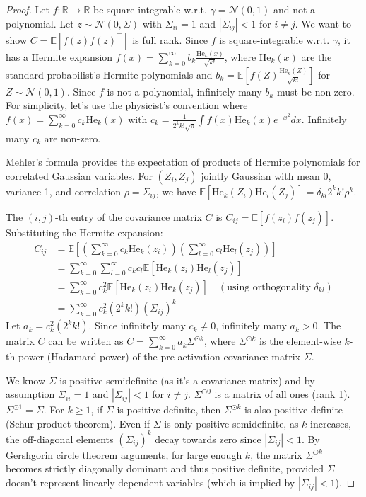\documentclass{article}
\newcommand{\R}{\mathbb{R}}
\newcommand{\E}{\mathbb{E}}
\newcommand{\He}{\mathrm{He}}
\begin{document}
\begin{proof}
    Let $f:\R\to\R$ be square-integrable w.r.t. $\gamma = \mathcal{N}(0,1)$ and not a polynomial. Let $z \sim \mathcal{N}(0, \Sigma)$ with $\Sigma_{ii}=1$ and $|\Sigma_{ij}| < 1$ for $i \neq j$. We want to show $C = \E[f(z)f(z)^\top]$ is full rank.
    Since $f$ is square-integrable w.r.t. $\gamma$, it has a Hermite expansion $f(x) = \sum_{k=0}^{\infty} b_k \frac{\He_k(x)}{\sqrt{k!}}$, where $\He_k(x)$ are the standard probabilist's Hermite polynomials and $b_k = \E[f(Z) \frac{\He_k(Z)}{\sqrt{k!}}]$ for $Z \sim \mathcal{N}(0,1)$. Since $f$ is not a polynomial, infinitely many $b_k$ must be non-zero. For simplicity, let's use the physicist's convention where $f(x) = \sum_{k=0}^{\infty} c_k \He_k(x)$ with $c_k = \frac{1}{2^k k! \sqrt{\pi}} \int f(x) \He_k(x) e^{-x^2} dx$. Infinitely many $c_k$ are non-zero.

    Mehler's formula \cite{mehler1866ueber, erdelyi1953higher} provides the expectation of products of Hermite polynomials for correlated Gaussian variables. For $(Z_i, Z_j)$ jointly Gaussian with mean 0, variance 1, and correlation $\rho = \Sigma_{ij}$, we have $\E[\He_k(Z_i) \He_l(Z_j)] = \delta_{kl} 2^k k! \rho^k$.

    The $(i, j)$-th entry of the covariance matrix $C$ is $C_{ij} = \E[f(z_i) f(z_j)]$. Substituting the Hermite expansion:
    \begin{align*}
    C_{ij} &= \E\left[ \left( \sum_{k=0}^{\infty} c_k \He_k(z_i) \right) \left( \sum_{l=0}^{\infty} c_l \He_l(z_j) \right) \right] \\
    &= \sum_{k=0}^{\infty} \sum_{l=0}^{\infty} c_k c_l \E[\He_k(z_i) \He_l(z_j)] \\
    &= \sum_{k=0}^{\infty} c_k^2 \E[\He_k(z_i) \He_k(z_j)] \quad (\text{using orthogonality } \delta_{kl}) \\
    &= \sum_{k=0}^{\infty} c_k^2 (2^k k!) (\Sigma_{ij})^k
    \end{align*}
    Let $a_k = c_k^2 (2^k k!)$. Since infinitely many $c_k \neq 0$, infinitely many $a_k > 0$. The matrix $C$ can be written as $C = \sum_{k=0}^{\infty} a_k \Sigma^{\odot k}$, where $\Sigma^{\odot k}$ is the element-wise $k$-th power (Hadamard power) of the pre-activation covariance matrix $\Sigma$.

    We know $\Sigma$ is positive semidefinite (as it's a covariance matrix) and by assumption $\Sigma_{ii}=1$ and $|\Sigma_{ij}|<1$ for $i \neq j$. $\Sigma^{\odot 0}$ is a matrix of all ones (rank 1). $\Sigma^{\odot 1} = \Sigma$. For $k \ge 1$, if $\Sigma$ is positive definite, then $\Sigma^{\odot k}$ is also positive definite (Schur product theorem). Even if $\Sigma$ is only positive semidefinite, as $k$ increases, the off-diagonal elements $(\Sigma_{ij})^k$ decay towards zero since $|\Sigma_{ij}|<1$. By Gershgorin circle theorem arguments, for large enough $k$, the matrix $\Sigma^{\odot k}$ becomes strictly diagonally dominant and thus positive definite, provided $\Sigma$ doesn't represent linearly dependent variables (which is implied by $|\Sigma_{ij}|<1$).


\end{proof}
\end{document}
